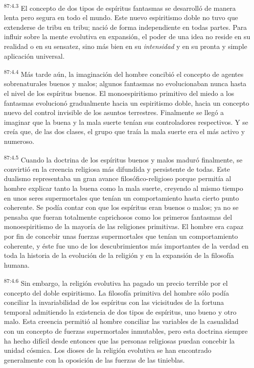 \par
\textsuperscript{87:4.3} El concepto de dos tipos de espíritus fantasmas se desarrolló de manera lenta pero segura en todo el mundo. Este nuevo espiritismo doble no tuvo que extenderse de tribu en tribu; nació de forma independiente en todas partes. Para influir sobre la mente evolutiva en expansión, el poder de una idea no reside en su realidad o en su sensatez, sino más bien en su \textit{intensidad} y en su pronta y simple aplicación universal.

\par
\textsuperscript{87:4.4} Más tarde aún, la imaginación del hombre concibió el concepto de agentes sobrenaturales buenos y malos; algunos fantasmas no evolucionaban nunca hasta el nivel de los espíritus buenos. El monoespiritismo primitivo del miedo a los fantasmas evolucionó gradualmente hacia un espiritismo doble, hacia un concepto nuevo del control invisible de los asuntos terrestres. Finalmente se llegó a imaginar que la buena y la mala suerte tenían sus controladores respectivos. Y se creía que, de las dos clases, el grupo que traía la mala suerte era el más activo y numeroso.

\par
\textsuperscript{87:4.5} Cuando la doctrina de los espíritus buenos y malos maduró finalmente, se convirtió en la creencia religiosa más difundida y persistente de todas. Este dualismo representaba un gran avance filosófico-religioso porque permitía al hombre explicar tanto la buena como la mala suerte, creyendo al mismo tiempo en unos seres supermortales que tenían un comportamiento hasta cierto punto coherente. Se podía contar con que los espíritus eran buenos o malos; ya no se pensaba que fueran totalmente caprichosos como los primeros fantasmas del monoespiritismo de la mayoría de las religiones primitivas. El hombre era capaz por fin de concebir unas fuerzas supermortales que tenían un comportamiento coherente, y éste fue uno de los descubrimientos más importantes de la verdad en toda la historia de la evolución de la religión y en la expansión de la filosofía humana.

\par
\textsuperscript{87:4.6} Sin embargo, la religión evolutiva ha pagado un precio terrible por el concepto del doble espiritismo. La filosofía primitiva del hombre sólo podía conciliar la invariabilidad de los espíritus con las vicisitudes de la fortuna temporal admitiendo la existencia de dos tipos de espíritus, uno bueno y otro malo. Esta creencia permitió al hombre conciliar las variables de la casualidad con un concepto de fuerzas supermortales inmutables, pero esta doctrina siempre ha hecho difícil desde entonces que las personas religiosas puedan concebir la unidad cósmica. Los dioses de la religión evolutiva se han encontrado generalmente con la oposición de las fuerzas de las tinieblas.

